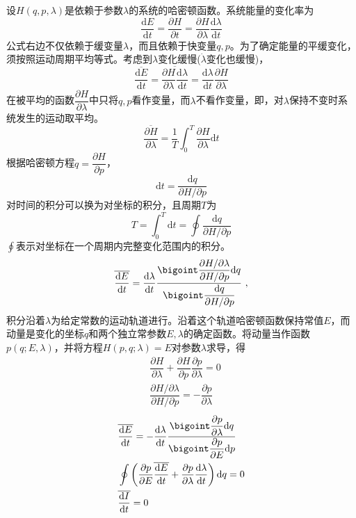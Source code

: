 \documentclass[11pt,a4paper]{article}
\newcommand{\dif}{\mathrm{d}}
\begin{document}
设$H(q, p, \lambda)$是依赖于参数$\lambda$的系统的哈密顿函数。系统能量的变化率为
\begin{equation}
\dfrac{\dif E}{\dif t} = \dfrac{\partial H}{\partial t} = \dfrac{\partial H}{\partial \lambda} \dfrac{\dif \lambda}{\dif t} 
\end{equation}
公式右边不仅依赖于缓变量$\lambda$，而且依赖于快变量$q, p$。为了确定能量的平缓变化，须按照运动周期平均等式。考虑到$\lambda$变化缓慢($\dot \lambda$变化也缓慢)，
\begin{equation}
\overline{\dfrac{\dif E}{\dif t} } = \overline{ \dfrac{\partial H}{\partial \lambda} \dfrac{\dif \lambda}{\dif t} } =  \dfrac{\dif \lambda}{\dif t} \overline{ \dfrac{\partial H}{\partial \lambda} } 
\end{equation}
在被平均的函数$\dfrac{\partial H}{\partial \lambda}$中只将$q, p$看作变量，而$\lambda$不看作变量，即，对$\lambda$保持不变时系统发生的运动取平均。
\begin{equation}
\overline{ \dfrac{\partial H}{\partial \lambda} } = \frac{1}{T} \int_0^T \dfrac{\partial H}{\partial \lambda} \dif t
\end{equation}
根据哈密顿方程$\dot q = \dfrac{\partial H}{\partial p}$，
\begin{equation}
\dif t = \frac{\dif q}{\partial H/\partial p}
\end{equation}
对时间的积分可以换为对坐标的积分，且周期$T$为
\begin{equation}
T = \int_0^T \dif t = \oint \frac{\dif q}{\partial H/\partial p}
\end{equation}
$\oint $表示对坐标在一个周期内完整变化范围内的积分。
\begin{equation}
\overline{\dfrac{\dif E}{\dif t} } = \dfrac{\dif \lambda}{\dif t} \dfrac{ \bigoint \dfrac{\partial H/\partial \lambda}{\partial H/\partial p}\dif q }{ \bigoint  \dfrac{\dif q}{\partial H/\partial p} } ~,
\end{equation}
积分沿着$\lambda$为给定常数的运动轨道进行。沿着这个轨道哈密顿函数保持常值$E$，而动量是变化的坐标$q$和两个独立常参数$E, \lambda$的确定函数。将动量当作函数$p(q; E, \lambda)$，并将方程$H(p, q; \lambda) = E$对参数$\lambda$求导，得
\begin{align*}
& \dfrac{\partial H}{\partial \lambda} + \dfrac{\partial H}{\partial p} \dfrac{\partial p}{\partial \lambda} = 0 \\
& \dfrac{\partial H/\partial \lambda }{\partial H/\partial p} = -\dfrac{\partial p}{\partial \lambda}
\end{align*}
\begin{align}
\nonumber & \overline{\dfrac{\dif E}{\dif t} } = -\dfrac{\dif \lambda}{\dif t}  \dfrac{ \bigoint \dfrac{\partial p}{\partial \lambda} \dif q }{ \bigoint \dfrac{\partial p}{\partial E} \dif p } \\
\nonumber & \oint \left(\dfrac{\partial p}{\partial E} \overline{\dfrac{\dif E}{\dif t} } +\dfrac{\partial p}{\partial \lambda} \dfrac{\dif \lambda}{\dif t} \right) \dif q = 0 \\
& \overline{\dfrac{\dif I}{\dif t} } = 0
\end{align}
\end{document}
